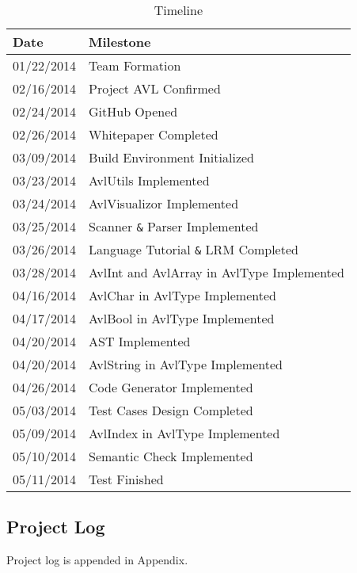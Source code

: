 \begin{table}[htp]
  \centering
  \begin{tabular}{|l|l|}
    \hline
    Date & Milestone \\
    \hline
    01/22/2014 \hspace{1cm} & Team Formation \\
    02/16/2014 & Project AVL Confirmed \\
    02/24/2014 & GitHub Opened \\
    02/26/2014 & Whitepaper Completed \\
    03/09/2014 & Build Environment Initialized \\
    03/23/2014 & AvlUtils Implemented \\
    03/24/2014 & AvlVisualizor Implemented \\
    03/25/2014 & Scanner \verb"&" Parser Implemented \\
    03/26/2014 & Language Tutorial \verb"&" LRM Completed \\
    03/28/2014 & AvlInt and AvlArray in AvlType Implemented \\
    04/16/2014 & AvlChar in AvlType Implemented \\
    04/17/2014 & AvlBool in AvlType Implemented \\
    04/20/2014 & AST Implemented \\
    04/20/2014 & AvlString in AvlType Implemented \\
    04/26/2014 & Code Generator Implemented \\
    05/03/2014 & Test Cases Design Completed \\
    05/09/2014 & AvlIndex in AvlType Implemented \\
    05/10/2014 & Semantic Check Implemented \\
    05/11/2014 & Test Finished \\
    \hline
  \end{tabular}
  \caption{Timeline}
  \label{tab:timeline}
\end{table}

\subsection{Project Log}

Project log is appended in Appendix.
